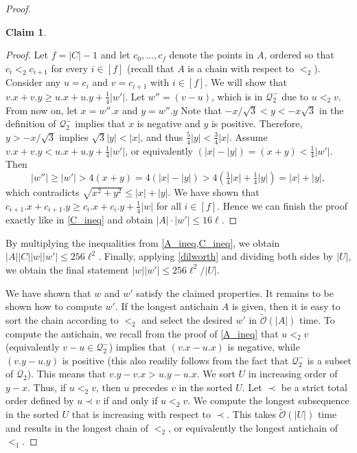 \documentclass[11pt, letterpaper]{article}
\theoremstyle{plain}
\theoremstyle{definition}
\newtheorem{claim}{Claim}
\theoremstyle{remark}
\newcommand{\tO}{\tilde{\mathcal{O}}}
\newcommand{\Q}{\mathcal{Q}}
\newcommand{\absolute}[1]{\lvert#1\rvert}
\begin{document}
\begin{proof}
\begin{claim}
\begin{proof}
		Let $f = |C| - 1$ and
		let $c_0, \dots, c_{f}$ denote the points in $A$, ordered so that $c_i <_2 c_{i + 1}$ for every $i \in [f]$ (recall that $A$ is a chain with respect to $<_2$).
		Consider any $u = c_i$ and $v = c_{i + 1}$ with $i \in [f]$. We will show that $v.x + v.y \geq u.x + u.y + \frac14\absolute{w'}$. 		
		Let $w'' = (v - u)$, which is in $\Q_2^-$ due to $u <_2 v$. From now on, let $x = w''.x$ and $y = w''.y$
		Note that $-x/\sqrt{3} < y < -x \sqrt{3}$ in the definition of $\Q_2^-$ implies that $x$ is negative and $y$ is positive.
		Therefore, $y > -x/\sqrt{3}$ implies $\sqrt{3}\absolute{y} < \absolute{x}$, and thus $\frac 5 4\absolute{y} < \frac 3 4\absolute{x}$.
		Assume $v.x + v.y < u.x + u.y + \frac14\absolute{w'}$, or equivalently $(\absolute{x} - \absolute{y}) = (x + y) < \frac14\absolute{w'}$. Then $$\absolute{w''} \geq \absolute{w'} > 4(x + y) = 4(\absolute{x} - \absolute{y}) > 4(\tfrac14\absolute{x} + \tfrac14\absolute{y}) = 
		\absolute{x} + \absolute{y},$$
		which contradicts $\sqrt{x^2 + y^2} \leq \absolute{x} + \absolute{y}$. We have shown that $c_{i + 1}.x + c_{i + 1}.y \geq c_i.x + c_i.y + \frac14\absolute{w}$ for all $i \in [f]$. Hence we can finish the proof exactly like in \cref{C_ineq} and obtain $\absolute{A}\cdot \absolute{w'} \leq 16\ell$.
	\end{proof}
\end{claim}

By multiplying the inequalities from \cref{A_ineq,C_ineq}, we obtain $\absolute{A}\absolute{C}\absolute{w}\absolute{w'} \leq 256\ell^2$. Finally, applying \cref{dilworth} and dividing both sides by $\absolute{U}$, we obtain the final statement $\absolute{w}\absolute{w'} \leq 256\ell^2/\absolute{U}$.

We have shown that $w$ and $w'$ satisfy the claimed properties. 
It remains to be shown how to compute $w'$. 
If the longest antichain $A$ is given, then it is easy to sort the chain according to $<_2$ and select the desired $w'$ in $\tO(\absolute{A})$ time. To compute the antichain, we recall from the proof of \cref{A_ineq} that $u <_2 v$ (equivalently $v - u \in \Q_2^-$) implies that $(v.x - u.x)$ is negative, while $(v.y - u.y)$ is positive (this also readily follows from the fact that $\Q_2^-$ is a subset of $\Q_2$). This means that $v.y - v.x > u.y - u.x$. We sort $U$ in increasing order of $y - x$. Thus, if $u <_2 v$, then $u$ precedes $v$ in the sorted $U$. 
Let $\prec$ be a strict total order defined by $u \prec v$ if and only if $u <_2 v$. We compute the longest subsequence in the sorted $U$ that is increasing with respect to $\prec$. This takes $\tO(\absolute{U})$ time and results in the longest chain of $<_2$, or equivalently the longest antichain of $<_1$.
\end{proof}
\end{document}
